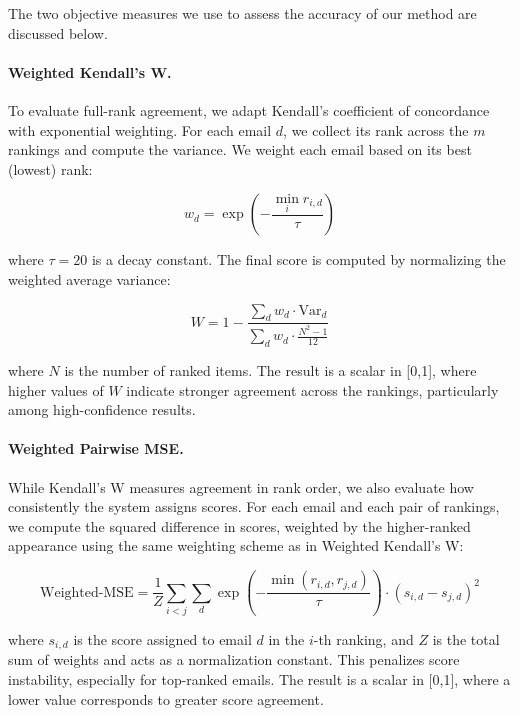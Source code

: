 \documentclass{article}
\begin{document}
The two objective measures we use to assess the accuracy of our method are discussed below.

\paragraph{Weighted Kendall’s W.}  
To evaluate full-rank agreement, we adapt Kendall’s coefficient of concordance with exponential weighting. For each email \(d\), we collect its rank across the \(m\) rankings and compute the variance. We weight each email based on its best (lowest) rank:

\begin{equation}
w_d = \exp\left(-\frac{\min_i r_{i,d}}{\tau}\right)
\end{equation}

where \(\tau = 20\) is a decay constant. The final score is computed by normalizing the weighted average variance:

\begin{equation}
W = 1 - \frac{\sum_d w_d \cdot \text{Var}_d}{\sum_d w_d \cdot \frac{N^2 - 1}{12}}
\end{equation}

where \(N\) is the number of ranked items. The result is a scalar in [0,1], where higher values of \(W\) indicate stronger agreement across the rankings, particularly among high-confidence results.

\paragraph{Weighted Pairwise MSE.}  
While Kendall’s W measures agreement in rank order, we also evaluate how consistently the system assigns scores. For each email and each pair of rankings, we compute the squared difference in scores, weighted by the higher-ranked appearance using the same weighting scheme as in Weighted Kendall's W:

\begin{equation}
\text{Weighted-MSE} = \frac{1}{Z} \sum_{i < j} \sum_d \exp\left(-\frac{\min(r_{i,d}, r_{j,d})}{\tau}\right) \cdot (s_{i,d} - s_{j,d})^2
\end{equation}

where \(s_{i,d}\) is the score assigned to email \(d\) in the \(i\)-th ranking, and \(Z\) is the total sum of weights and acts as a normalization constant. This penalizes score instability, especially for top-ranked emails. The result is a scalar in [0,1], where a lower value corresponds to greater score agreement.
\end{document}
